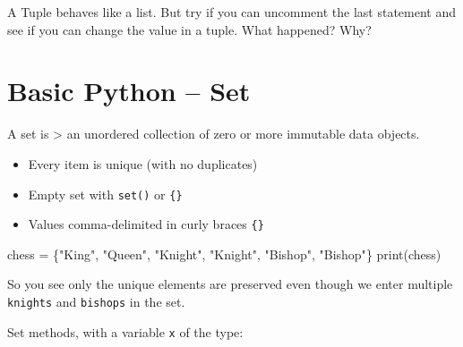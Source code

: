 \documentclass[
  letterpaper,
]{scrbook}
\newenvironment{Shaded}{\begin{snugshade}}{\end{snugshade}}
\newcommand{\BuiltInTok}[1]{\textcolor[rgb]{0.00,0.23,0.31}{#1}}
\newcommand{\NormalTok}[1]{\textcolor[rgb]{0.00,0.23,0.31}{#1}}
\newcommand{\OperatorTok}[1]{\textcolor[rgb]{0.37,0.37,0.37}{#1}}
\newcommand{\StringTok}[1]{\textcolor[rgb]{0.13,0.47,0.30}{#1}}
\providecommand{\tightlist}{%
  \setlength{\itemsep}{0pt}\setlength{\parskip}{0pt}}
\begin{document}
A Tuple behaves like a list. But try if you can uncomment the last
statement and see if you can change the value in a tuple. What happened?
Why?

\section*{Basic Python -- Set}\label{basic-python-set}


A set is \textgreater{} an unordered collection of zero or more
immutable data objects.

\begin{itemize}
\tightlist
\item
  Every item is unique (with no duplicates)
\item
  Empty set with \texttt{set()} or \texttt{\{\}}
\item
  Values comma-delimited in curly braces \texttt{\{\}}
\end{itemize}

\begin{Shaded}
\begin{Highlighting}[]
\NormalTok{chess }\OperatorTok{=}\NormalTok{ \{}\StringTok{"King"}\NormalTok{, }\StringTok{"Queen"}\NormalTok{, }\StringTok{"Knight"}\NormalTok{, }\StringTok{"Knight"}\NormalTok{, }\StringTok{"Bishop"}\NormalTok{, }\StringTok{"Bishop"}\NormalTok{\}}
\BuiltInTok{print}\NormalTok{(chess)}
\end{Highlighting}
\end{Shaded}

So you see only the unique elements are preserved even though we enter
multiple \texttt{knights} and \texttt{bishops} in the set.

Set methods, with a variable \texttt{x} of the type:
\end{document}
